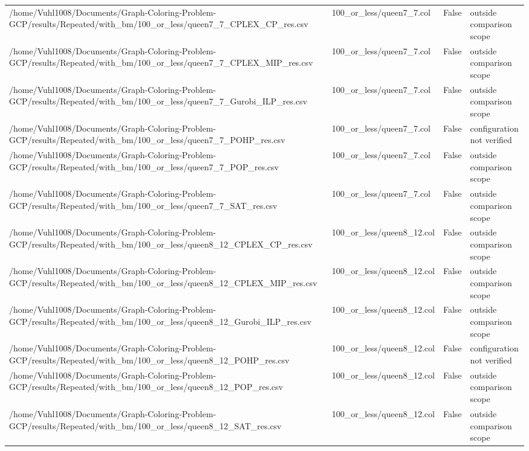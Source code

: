 \begin{table}[htbp]
\begin{tabular}{llll}
/home/Vuhl1008/Documents/Graph-Coloring-Problem-GCP/results/Repeated/with\_bm/100\_or\_less/queen7\_7\_CPLEX\_CP\_res.csv & 100\_or\_less/queen7\_7.col & False & outside comparison scope \\
/home/Vuhl1008/Documents/Graph-Coloring-Problem-GCP/results/Repeated/with\_bm/100\_or\_less/queen7\_7\_CPLEX\_MIP\_res.csv & 100\_or\_less/queen7\_7.col & False & outside comparison scope \\
/home/Vuhl1008/Documents/Graph-Coloring-Problem-GCP/results/Repeated/with\_bm/100\_or\_less/queen7\_7\_Gurobi\_ILP\_res.csv & 100\_or\_less/queen7\_7.col & False & outside comparison scope \\
/home/Vuhl1008/Documents/Graph-Coloring-Problem-GCP/results/Repeated/with\_bm/100\_or\_less/queen7\_7\_POHP\_res.csv & 100\_or\_less/queen7\_7.col & False & configuration not verified \\
/home/Vuhl1008/Documents/Graph-Coloring-Problem-GCP/results/Repeated/with\_bm/100\_or\_less/queen7\_7\_POP\_res.csv & 100\_or\_less/queen7\_7.col & False & outside comparison scope \\
/home/Vuhl1008/Documents/Graph-Coloring-Problem-GCP/results/Repeated/with\_bm/100\_or\_less/queen7\_7\_SAT\_res.csv & 100\_or\_less/queen7\_7.col & False & outside comparison scope \\
/home/Vuhl1008/Documents/Graph-Coloring-Problem-GCP/results/Repeated/with\_bm/100\_or\_less/queen8\_12\_CPLEX\_CP\_res.csv & 100\_or\_less/queen8\_12.col & False & outside comparison scope \\
/home/Vuhl1008/Documents/Graph-Coloring-Problem-GCP/results/Repeated/with\_bm/100\_or\_less/queen8\_12\_CPLEX\_MIP\_res.csv & 100\_or\_less/queen8\_12.col & False & outside comparison scope \\
/home/Vuhl1008/Documents/Graph-Coloring-Problem-GCP/results/Repeated/with\_bm/100\_or\_less/queen8\_12\_Gurobi\_ILP\_res.csv & 100\_or\_less/queen8\_12.col & False & outside comparison scope \\
/home/Vuhl1008/Documents/Graph-Coloring-Problem-GCP/results/Repeated/with\_bm/100\_or\_less/queen8\_12\_POHP\_res.csv & 100\_or\_less/queen8\_12.col & False & configuration not verified \\
/home/Vuhl1008/Documents/Graph-Coloring-Problem-GCP/results/Repeated/with\_bm/100\_or\_less/queen8\_12\_POP\_res.csv & 100\_or\_less/queen8\_12.col & False & outside comparison scope \\
/home/Vuhl1008/Documents/Graph-Coloring-Problem-GCP/results/Repeated/with\_bm/100\_or\_less/queen8\_12\_SAT\_res.csv & 100\_or\_less/queen8\_12.col & False & outside comparison scope \\

\end{tabular}
\end{table}
